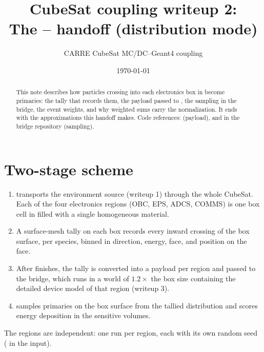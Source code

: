 

\title{CubeSat coupling writeup 2:\\The \mcdc{}--\gfour{} handoff (distribution mode)}
\author{CARRE CubeSat MC/DC--Geant4 coupling}
\date{\today}


\maketitle

\begin{abstract}
This note describes how particles crossing into each electronics box in \mcdc{} become \gfour{} primaries: the tally that records them, the payload passed to \gfour{}, the sampling in the bridge, the event weights, and why weighted \gfour{} sums carry the \mcdc{} normalization. It ends with the approximations this handoff makes. Code references:  (payload),  and  in the bridge repository (sampling).
\end{abstract}

\section{Two-stage scheme}
\begin{enumerate}
  \item \mcdc{} \citep{morgan2024mcdc} transports the environment source (writeup 1) through the whole CubeSat. Each of the four electronics regions (OBC, EPS, ADCS, COMMS) is one box cell in \mcdc{} filled with a single homogeneous material.
  \item A surface-mesh  tally on each box records every inward crossing of the box surface, per species, binned in direction, energy, face, and position on the face.
  \item After \mcdc{} finishes, the tally is converted into a payload per region and passed to the bridge, which runs \gfour{} \citep{agostinelli2003geant4,allison2006geant4,allison2016recent} in a world of $1.2\times$ the box size containing the detailed device model of that region (writeup 3).
  \item \gfour{} samples primaries on the box surface from the tallied distribution and scores energy deposition in the sensitive volumes.
\end{enumerate}
The regions are independent: one \gfour{} run per region, each with its own random seed ( in the input).


